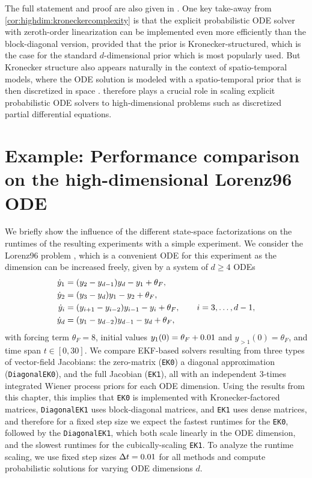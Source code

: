 \documentclass{mimosis}
\begin{document}
The full statement and proof are also given in \highdim{}.
One key take-away from \cref{cor:highdim:kroneckercomplexity} is that the explicit probabilistic ODE solver with zeroth-order linearization can be implemented even more efficiently than the block-diagonal version, provided that the prior is Kronecker-structured, which is the case for the standard \(d\)-dimensional  prior which is most popularly used.
But Kronecker structure also appears naturally in the context of spatio-temporal models, where the ODE solution is modeled with a spatio-temporal prior that is then discretized in space
\parencite{pmlr-v151-kramer22a}.
 therefore plays a crucial role in scaling explicit probabilistic ODE solvers to high-dimensional problems such as discretized partial differential equations.
\section{Example: Performance comparison on the high-dimensional Lorenz96 ODE}
\label{sec:org1d36175}
We briefly show the influence of the different state-space factorizations on the runtimes of the resulting experiments with a simple experiment.
We consider the Lorenz96 problem \parencite{lorenz96}, which is a convenient ODE for this experiment as the dimension can be increased freely,
given by a system of \(d\geq4\) ODEs
\begin{subequations}
\begin{align}
  \dot{\val}_1 &= \left( \val_2 - \val_{d-1} \right) \val_d - \val_1 + \theta_F, \\
  \dot{\val}_2 &= \left( \val_3 - \val_d \right) \val_1 - \val_2 + \theta_F, \\
  \dot{\val}_i &= \left( \val_{i+1} - \val_{i-2} \right) \val_{i-1} - \val_{i} + \theta_F, \qquad i=3, \dots, d-1, \\
  \dot{\val}_d &= \left( \val_{1} - \val_{d-2} \right) \val_{d-1} - \val_d + \theta_F,
\end{align}
\end{subequations}
with forcing term \(\theta_F=8\),
initial values \(y_1(0) = \theta_F + 0.01\) and \(y_{>1}(0) = \theta_F\),
and time span \(t \in [0, 30]\).
We compare EKF-based solvers resulting from three types of vector-field Jacobians:
the zero-matrix (\texttt{EK0})
a diagonal approximation (\texttt{DiagonalEK0}),
and the full Jacobian (\texttt{EK1}),
all with an independent 3-times integrated Wiener process priors for each ODE dimension.
Using the results from this chapter, this implies that
\texttt{EK0} is implemented with Kronecker-factored matrices,
\texttt{DiagonalEK1} uses block-diagonal matrices,
and \texttt{EK1} uses dense matrices,
and therefore for a fixed step size we expect the fastest runtimes for the
\texttt{EK0}, followed by the \texttt{DiagonalEK1}, which both scale linearly in the ODE dimension,
and the slowest runtimes for the cubically-scaling \texttt{EK1}.
To analyze the runtime scaling, we use fixed step sizes \({\Delta t} = 0.01\) for all methods and compute probabilistic solutions for varying ODE dimensions \(d\).
\end{document}
